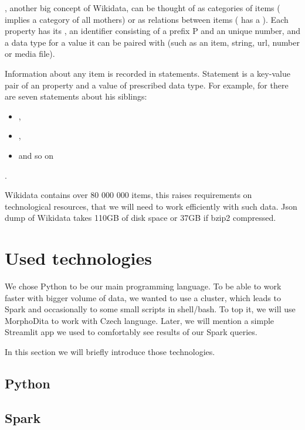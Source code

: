 , another big concept of Wikidata, can be thought of as categories of items ( implies a category of all mothers) or as relations between items ( has a  ). Each property has its , an identifier consisting of a prefix P and an unique number, and a data type for a value it can be paired with (such as an item, string, url, number or media file). 

Information about any item is recorded in statements. Statement is a key-value pair of an property and a value of prescribed data type. For example, for  there are seven statements about his siblings:
\begin{itemize}
\item {} , 
\item {} ,
\item {}  and so on
\end{itemize} . 

Wikidata contains over 80 000 000 items, this raises requirements on technological resources, that we will need to work efficiently with such data. Json dump of Wikidata takes 110GB of disk space or 37GB if bzip2 compressed.

\section{Used technologies}
We chose Python to be our main programming language. To be able to work faster with bigger volume of data, we wanted to use a cluster, which leads to Spark and occasionally to some small scripts in shell/bash. To top it, we will use MorphoDita to work with Czech language. Later, we will mention a simple Streamlit app we used to comfortably see results of our Spark queries.

In this section we will briefly introduce those technologies.
\subsection{Python}
\subsection{Spark}

